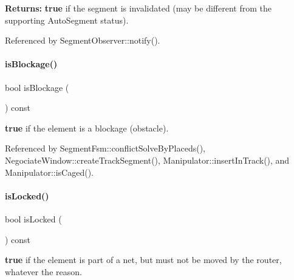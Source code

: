 {\bfseries Returns\+:} {\bfseries true} if the segment is invalidated (may be different from the supporting Auto\+Segment status). 

Referenced by Segment\+Observer\+::notify().

\mbox{\label{classKite_1_1TrackElement_a3fffa77f98cf6f0375f831bddce8a8fe}} 
\paragraph{\texorpdfstring{is\+Blockage()}{isBlockage()}}
{\footnotesize\ttfamily bool is\+Blockage (\begin{DoxyParamCaption}{ }\end{DoxyParamCaption}) const\hspace{0.3cm}{\ttfamily [inline]}}

{\bfseries true} if the element is a blockage (obstacle). 

Referenced by Segment\+Fsm\+::conflict\+Solve\+By\+Placeds(), Negociate\+Window\+::create\+Track\+Segment(), Manipulator\+::insert\+In\+Track(), and Manipulator\+::is\+Caged().

\mbox{\label{classKite_1_1TrackElement_a43966e19963e4bcb7f7f9b5327ec732b}} 
\paragraph{\texorpdfstring{is\+Locked()}{isLocked()}}
{\footnotesize\ttfamily bool is\+Locked (\begin{DoxyParamCaption}{ }\end{DoxyParamCaption}) const\hspace{0.3cm}{\ttfamily [inline]}}

{\bfseries true} if the element is part of a net, but must not be moved by the router, whatever the reason. \mbox{\label{classKite_1_1TrackElement_a29202b7dfab21852f8c8d773de7b3728}} 
